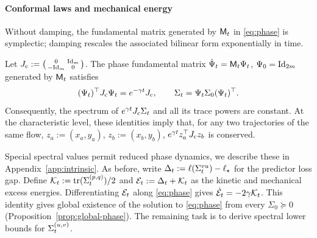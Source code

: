 \paragraph{Conformal laws and mechanical energy}
Without damping, the fundamental matrix generated by $\mathsf M_t$ in \eqref{eq:phase} is symplectic;
damping rescales the associated bilinear form exponentially in time.
\begin{proposition}\label{prop:phase-laws}
Let $J_{\mathrm c}:=\begin{psmallmatrix}0&\mathrm{Id}_m\\-\mathrm{Id}_m&0\end{psmallmatrix}$.
The phase fundamental matrix \(\dot\Psi_t=\mathsf M_t\Psi_t\),
\(\Psi_0=\mathrm{Id}_{2m}\) generated by $\mathsf M_t$ satisfies
\[
 (\Psi_t)^\top J_{\mathrm c}\Psi_t=e^{-\gamma t}J_{\mathrm c},\qquad
 \Sigma_t=\Psi_t\Sigma_0(\Psi_t)^\top.
\]
Consequently, the spectrum of \(e^{\gamma t}J_{\mathrm c}\Sigma_t\)
and all its trace powers are constant. At the characteristic level,
these identities imply that, for any two trajectories of
the same flow, \(z_a:=(x_a,y_a)\), \(z_b:=(x_b,y_b)\),
\(e^{\gamma t}z_a^\top J_{\mathrm c} z_b\) is conserved.
\end{proposition}

Special spectral values permit reduced phase dynamics, we describe these in Appendix~\ref{app:intrinsic}.
As before, write $\Delta_t:=\ell(\Sigma^{vu}_t)-\ell_\star$ for the predictor loss gap. Define $\mathcal{K}_t:=\operatorname{tr}(\Sigma^{(p,q)}_t)/2$ and $\mathcal E_t:=\Delta_t+\mathcal{K}_t$ as the kinetic and mechanical excess energies. Differentiating $\mathcal E_t$ along \eqref{eq:phase} gives $\dot{\mathcal E}_t=-2\gamma\mathcal{K}_t$.
This identity gives global existence of the solution to \eqref{eq:phase} from every $\Sigma_0 \succeq 0$ (Proposition~\ref{prop:global-phase}).
The remaining task is to derive spectral lower bounds for $\Sigma^{(u,v)}_t$.

